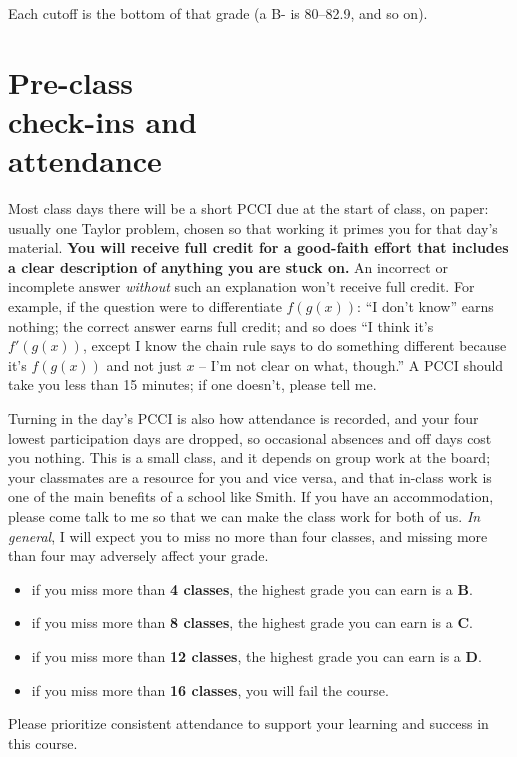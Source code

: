\medskip
Each cutoff is the bottom of that grade (a B- is 80--82.9, and so on).

\bigskip

\section{Pre-class \\ check-ins and \\ attendance}
%
Most class days there will be a short PCCI due at the start of class, on
paper: usually one Taylor problem, chosen so that working it primes you
for that day's material. \textbf{You will receive full credit for a
good-faith effort that includes a clear description of anything you are
stuck on.} An incorrect or incomplete answer \emph{without} such an
explanation won't receive full credit. For example, if the question were
to differentiate $f(g(x))$: ``I don't know'' earns nothing; the correct
answer earns full credit; and so does ``I think it's $f'(g(x))$, except I
know the chain rule says to do something different because it's $f(g(x))$
and not just $x$ -- I'm not clear on what, though.'' A PCCI should take
you less than 15 minutes; if one doesn't, please tell me.

\medskip
Turning in the day's PCCI is also how attendance is recorded, and your
four lowest participation days are dropped, so occasional absences and
off days cost you nothing. This is a small class, and it depends on group
work at the board; your classmates are a resource for you and vice versa,
and that in-class work is one of the main benefits of a school like
Smith. If you have an accommodation, please come talk to me so that we
can make the class work for both of us. \emph{In general}, I will
expect you to miss no more than four classes, and missing more than four
may adversely affect your grade.
\begin{itemize}
    \item if you miss more than \textbf{4 classes}, the highest grade you can earn is a \textbf{B}.
    \item if you miss more than \textbf{8 classes}, the highest grade you can earn is a \textbf{C}.
    \item if you miss more than \textbf{12 classes}, the highest grade you can earn is a \textbf{D}.
    \item if you miss more than \textbf{16 classes}, you will fail the course.
\end{itemize}
Please prioritize consistent attendance to support your learning and success in this course.

